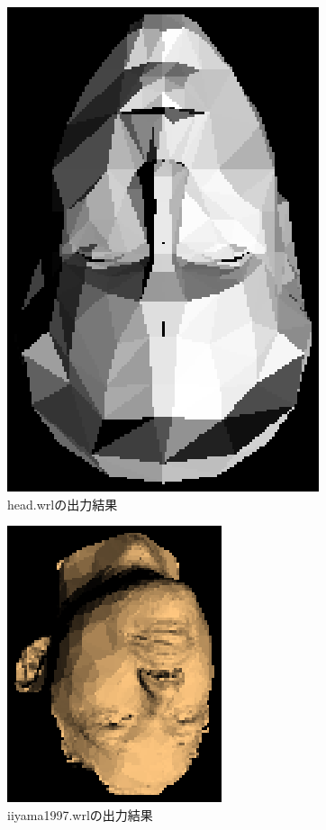 \documentclass[a4j,dvipdfmx]{jsarticle}
\begin{document}
\begin{figure}[p]
  \begin{center}
    \includegraphics[clip,scale=0.5]{images/Kadai02ForHead.eps}
    \caption{head.wrlの出力結果}
    \label{head}
  \end{center}
\end{figure}

\begin{figure}[p]
  \begin{center}
    \includegraphics[clip,scale=0.5]{images/Kadai02ForIiyama1997.eps}
    \caption{iiyama1997.wrlの出力結果}
    \label{1997}
  \end{center}
\end{figure}
\end{document}
